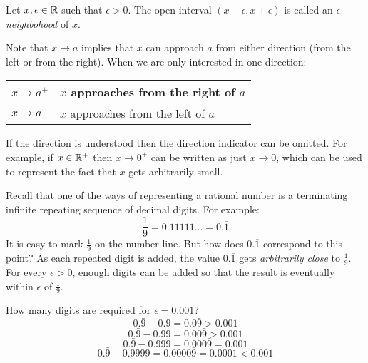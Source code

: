 \documentclass[letterpaper,12pt,fleqn]{article}
\newcommand{\e}{\epsilon}
\begin{document}
\begin{definition}[Neighborhood]
  Let \(x,\e\in\R\) such that \(\e>0\).  The open interval \((x-\e,x+\e)\) is called an \emph{\(\e\)-neighbohood}
  of \(x\).
\end{definition}

\begin{notation}
Note that \(x\to a\) implies that \(x\) can approach \(a\) from either direction (from the left or from the right).
When we are only interested in one direction:

\bigskip

\begin{center}
  \begin{tabular}{|c|l|}
    \hline
    \(x\to a^+\) & \(x\) approaches from the right of \(a\) \\
    \hline
    \(x\to a^-\) & \(x\) approaches from the left of \(a\) \\
    \hline
  \end{tabular}
\end{center}

\bigskip

If the direction is understood then the direction indicator can be omitted.  For example, if \(x\in\mathbb{R}^+\) then
\(x\to0^+\) can be written as just \(x\to0\), which can be used to represent the fact that \(x\) gets arbitrarily
small.
\end{notation}

\begin{example}
  Recall that one of the ways of representing a rational number is a terminating infinite repeating sequence of
  decimal digits.  For example:
  \[\frac{1}{9}=0.11111\ldots=0.\overline{1}\]
  It is easy to mark \(\frac{1}{9}\) on the number line.  But how does \(0.\overline{1}\) correspond to this point?
  As each repeated digit is added, the value \(0.\overline{1}\) gets \emph{arbitrarily close} to \(\frac{1}{9}\).
  For every \(\e>0\), enough digits can be added so that the result is eventually within \(\e\) of \(\frac{1}{9}\).

  \bigskip

  \begin{center}
  \end{center}

  How many digits are required for \(\e=0.001\)?
  \[0.\bar{9}-0.9=0.0\bar{9}>0.001\]
  \[0.\bar{9}-0.99=0.00\bar{9}>0.001\]
  \[0.\bar{9}-0.999=0.000\bar{9}=0.001\]
  \[0.\bar{9}-0.9999=0.0000\bar{9}=0.0001<0.001\]
\end{example}
\end{document}
